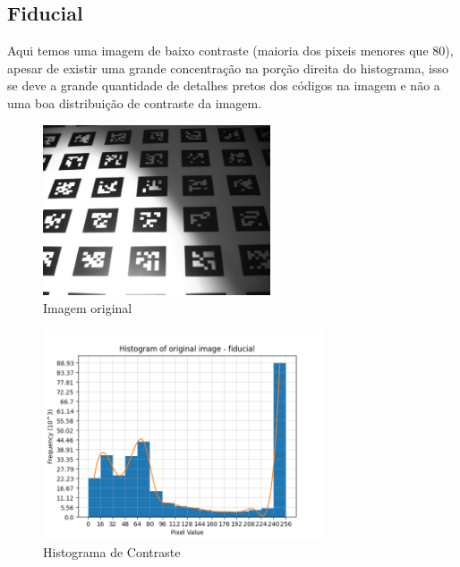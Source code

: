 \documentclass[12pt, letterpaper]{article}
\begin{document}
    \subsection{Fiducial}
        Aqui temos uma imagem de baixo contraste (maioria dos pixeis menores que 80), apesar de existir uma grande concentração na porção direita do histograma, isso se deve a grande quantidade de detalhes pretos dos códigos na imagem e não a uma boa distribuição de contraste da imagem.
        \begin{figure}[H]
            \label{hist:fiducial}
            \centering
            \includegraphics[width=0.6\textwidth]{fiducial.png}
            \\{Imagem original}

            \includegraphics[width=0.74\textwidth]{fiducial_histogram.png}
            \\{Histograma de Contraste}
        \end{figure}
\end{document}
